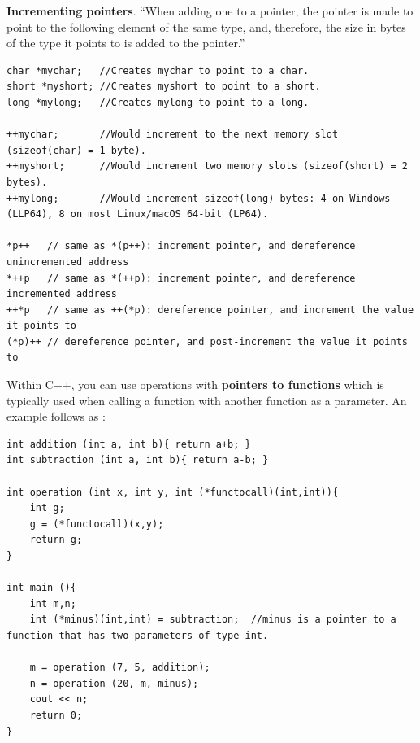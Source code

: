 \textbf{Incrementing pointers}. ``When adding one to a pointer, the pointer is made to point to the following element of the same type, and, therefore, the size in bytes of the type it points to is added to the pointer.''
\begin{lstlisting}
char *mychar;   //Creates mychar to point to a char.
short *myshort; //Creates myshort to point to a short.
long *mylong;   //Creates mylong to point to a long.

++mychar;       //Would increment to the next memory slot (sizeof(char) = 1 byte).
++myshort;      //Would increment two memory slots (sizeof(short) = 2 bytes).
++mylong;       //Would increment sizeof(long) bytes: 4 on Windows (LLP64), 8 on most Linux/macOS 64-bit (LP64).

*p++   // same as *(p++): increment pointer, and dereference unincremented address
*++p   // same as *(++p): increment pointer, and dereference incremented address
++*p   // same as ++(*p): dereference pointer, and increment the value it points to
(*p)++ // dereference pointer, and post-increment the value it points to 
\end{lstlisting}

Within C++, you can use operations with \textbf{pointers to functions} which is typically used when calling a function with another function as a parameter. An example follows as \cite{cpp:pointers}:
\begin{lstlisting}
int addition (int a, int b){ return a+b; }
int subtraction (int a, int b){ return a-b; }

int operation (int x, int y, int (*functocall)(int,int)){
	int g;
	g = (*functocall)(x,y);
	return g;
}

int main (){
	int m,n;
	int (*minus)(int,int) = subtraction;  //minus is a pointer to a function that has two parameters of type int.
	
	m = operation (7, 5, addition);
	n = operation (20, m, minus);
	cout << n;
	return 0;
}
\end{lstlisting}

